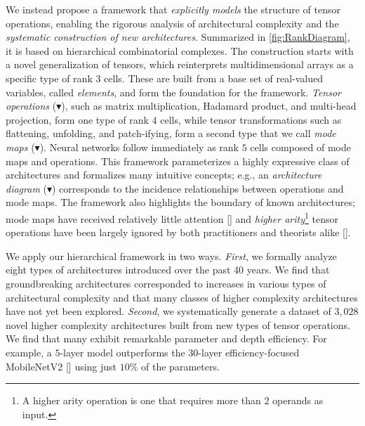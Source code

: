 \documentclass{article}
\theoremstyle{plain}
\theoremstyle{definition}
\theoremstyle{remark}
\newcommand{\citenump}[1]{[\citenum{#1}]}
\newcommand{\NumSamples}{3,028} %
\begin{document}
We instead propose a framework that \textit{explicitly models} the structure of tensor operations, enabling the rigorous analysis of architectural complexity and the \textit{systematic construction of new architectures}.  Summarized in \cref{fig:RankDiagram}, it is based on hierarchical combinatorial complexes.  The construction starts with a novel generalization of tensors, which reinterprets multidimensional arrays as a specific type of rank $3$ cells.  These are built from a base set of real-valued variables, called \textit{elements}, and form the foundation for the framework.  {\color{purple}\textit{Tensor operations}} ({\color{purple}$\blacktriangledown$}), such as matrix multiplication, Hadamard product, and multi-head projection, form one type of rank $4$ cells, while tensor transformations such as flattening, unfolding, and patch-ifying, form a second type that we call {\color{cyan}\textit{mode maps}} ({\color{cyan}$\blacktriangledown$}). Neural networks follow immediately as rank $5$ cells composed of mode maps and operations.  This framework parameterizes a highly expressive class of architectures and formalizes many intuitive concepts; e.g., an {\color{orange}\textit{architecture diagram}} ({\color{orange}$\blacktriangledown$}) corresponds to the incidence relationships between operations and mode maps. The framework also highlights the boundary of known architectures; {\color{cyan}mode maps} have received relatively little attention \citenump{DefCNNs, SpiralMLP} and \textit{higher arity}\footnote{A higher arity operation is one that requires more than $2$ operands as input.} {\color{purple}tensor operations} have been largely ignored by both practitioners and theorists alike \citenump{Plexes}.

We apply our hierarchical framework in two ways. \textit{First}, we formally analyze eight types of architectures introduced over the past 40 years. We find that groundbreaking architectures corresponded to increases in various types of architectural complexity and that many classes of higher complexity architectures have not yet been explored. \textit{Second}, we systematically generate a dataset of $\NumSamples$ novel higher complexity architectures built from new types of tensor operations. We find that many exhibit remarkable parameter and depth efficiency. For example, a $5$-layer model outperforms the $30$-layer efficiency-focused MobileNetV2 \citenump{MobileNet} using just $10\%$ of the parameters.
\end{document}
